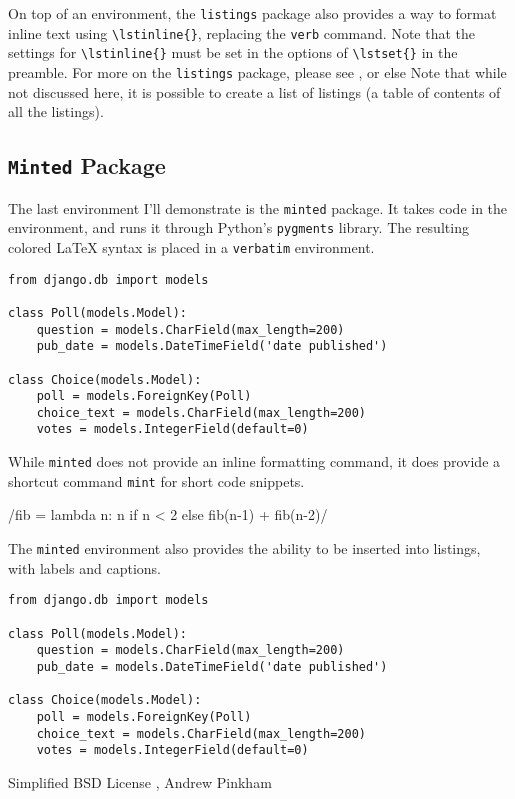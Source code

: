 On top of an environment, the \lstinline{listings} package also provides a way to format inline text using \lstinline|\lstinline{}|, replacing the \lstinline{verb} command. Note that the settings for \lstinline|\lstinline{}| must be set in the options of \lstinline|\lstset{}| in the preamble. For more on the \lstinline{listings} package, please see , or else 
Note that while not discussed here, it is possible to create a list of listings (a table of contents of all the listings).

\subsection{\texttt{Minted} Package}

The last environment I'll demonstrate is the \verb|minted| package. It takes code in the environment, and runs it through Python's \verb|pygments| library. The resulting colored \LaTeX{} syntax is placed in a \verb|verbatim| environment.

\begin{verbatim}
from django.db import models

class Poll(models.Model):
    question = models.CharField(max_length=200)
    pub_date = models.DateTimeField('date published')

class Choice(models.Model):
    poll = models.ForeignKey(Poll)
    choice_text = models.CharField(max_length=200)
    votes = models.IntegerField(default=0)
\end{verbatim}

While \verb|minted| does not provide an inline formatting command, it does provide a shortcut command \verb|mint| for short code snippets.

/fib = lambda n: n if n < 2 else fib(n-1) + fib(n-2)/

The \verb|minted| environment also provides the ability to be inserted into listings, with labels and captions.

\begin{listing}[H]
\begin{verbatim}
from django.db import models

class Poll(models.Model):
    question = models.CharField(max_length=200)
    pub_date = models.DateTimeField('date published')

class Choice(models.Model):
    poll = models.ForeignKey(Poll)
    choice_text = models.CharField(max_length=200)
    votes = models.IntegerField(default=0)
\end{verbatim}
\cprotect\caption{\verb|models.py| from Django Tutorial}
\label{code:django:models_basic_minted}
\end{listing}

\listoflistings

\begin{center}
Simplified BSD License , Andrew Pinkham
 \end{center}


